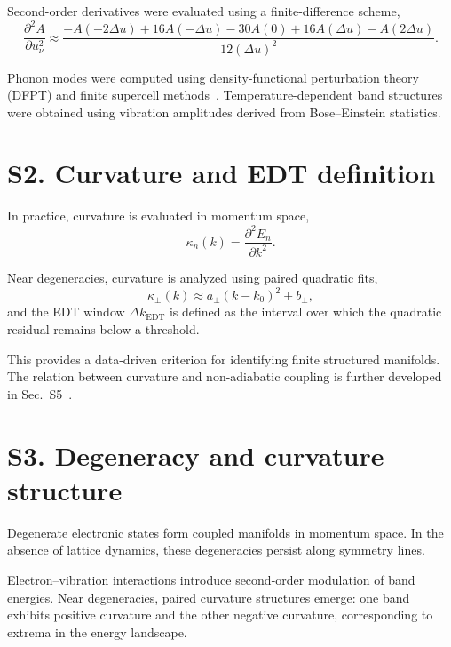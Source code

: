 \documentclass[12pt]{article}
\begin{document}
Second-order derivatives were evaluated using a finite-difference scheme,
\begin{equation}
\frac{\partial^2 A}{\partial u_\nu^2}
\approx
\frac{-A(-2\Delta u) + 16A(-\Delta u) - 30A(0) + 16A(\Delta u) - A(2\Delta u)}{12(\Delta u)^2}.
\end{equation}

Phonon modes were computed using density-functional perturbation theory (DFPT) and finite supercell methods~\cite{Baroni2001}. Temperature-dependent band structures were obtained using vibration amplitudes derived from Bose--Einstein statistics.

\section*{S2. Curvature and EDT definition}

In practice, curvature is evaluated in momentum space,
\begin{equation}
\kappa_n(k) = \frac{\partial^2 E_n}{\partial k^2}.
\end{equation}

Near degeneracies, curvature is analyzed using paired quadratic fits,
\begin{equation}
\kappa_\pm(k) \approx a_\pm (k-k_0)^2 + b_\pm,
\end{equation}
and the EDT window $\Delta k_{\mathrm{EDT}}$ is defined as the interval over which the quadratic residual remains below a threshold.

This provides a data-driven criterion for identifying finite structured manifolds. The relation between curvature and non-adiabatic coupling is further developed in Sec.~S5~\cite{Mead1979,Yarkony1996}.

\section*{S3. Degeneracy and curvature structure}

Degenerate electronic states form coupled manifolds in momentum space. In the absence of lattice dynamics, these degeneracies persist along symmetry lines.

Electron--vibration interactions introduce second-order modulation of band energies. Near degeneracies, paired curvature structures emerge: one band exhibits positive curvature and the other negative curvature, corresponding to extrema in the energy landscape.
\end{document}
